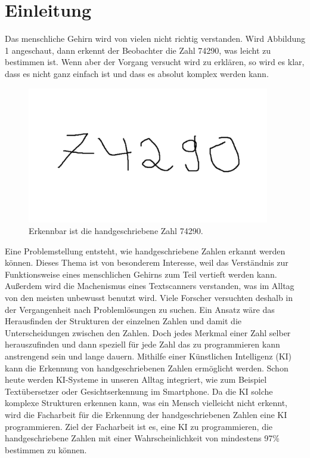 \documentclass[11pt]{article}
\begin{document}
\section{Einleitung}
Das menschliche Gehirn wird von vielen nicht richtig verstanden. Wird Abbildung 1 angeschaut, dann erkennt der Beobachter die Zahl 74290,
was leicht zu bestimmen ist. Wenn aber der Vorgang versucht wird zu erklären, so wird es klar, dass es nicht ganz einfach ist
und dass es absolut komplex werden kann.
\begin{figure}[h]
    \centering
    \includegraphics[width=300pt, keepaspectratio]{images/zahlen}
    \caption[Handgeschriebene]{Erkennbar ist die handgeschriebene Zahl 74290.}
\end{figure}
Eine Problemstellung entsteht, wie handgeschriebene Zahlen erkannt werden können.
Dieses Thema ist von besonderem Interesse, weil das Verständnis zur Funktionsweise eines menschlichen Gehirns zum Teil vertieft werden kann.
Außerdem wird die Machenismus eines Textscanners verstanden, was im Alltag von den meisten unbewusst benutzt wird.
Viele Forscher versuchten deshalb in der Vergangenheit nach Problemlösungen zu suchen. Ein Ansatz wäre das Herausfinden
der Strukturen der einzelnen Zahlen und damit die Unterscheidungen zwischen den Zahlen.
Doch jedes Merkmal einer Zahl selber herauszufinden und dann speziell für jede Zahl das zu programmieren kann
anstrengend sein und lange dauern. Mithilfe einer Künstlichen Intelligenz (KI) kann die Erkennung von handgeschriebenen Zahlen ermöglicht werden. 
Schon heute werden KI-Systeme in unseren Alltag integriert, wie zum Beispiel Textübersetzer oder Gesichtserkennung im Smartphone. Da die KI solche
komplexe Strukturen erkennen kann, was ein Mensch vielleicht nicht erkennt, wird die Facharbeit für die Erkennung der handgeschriebenen Zahlen eine KI programmieren. 
Ziel der Facharbeit ist es, eine KI zu programmieren, die handgeschriebene Zahlen mit einer Wahrscheinlichkeit von mindestens 97\% bestimmen zu können.
\end{document}
